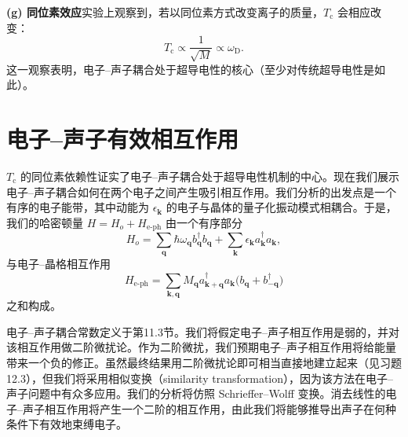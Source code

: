 \textbf{(g) 同位素效应}\quad 实验上观察到，若以同位素方式改变离子的质量，$T_{\mathrm{c}}$ 会相应改变：
\begin{equation*}
T_{\mathrm{c}}\propto\frac{1}{\sqrt{M}}\propto\omega_{\mathrm{D}}.\tag{12.21}
\end{equation*}
这一观察表明，电子–声子耦合处于超导电性的核心（至少对传统超导电性是如此）。

\section{电子–声子有效相互作用}

$T_{\mathrm{c}}$ 的同位素依赖性证实了电子–声子耦合处于超导电性机制的中心。现在我们展示电子–声子耦合如何在两个电子之间产生吸引相互作用。我们分析的出发点是一个有序的电子能带，其中动能为 $\epsilon_{\mathbf{k}}$ 的电子与晶体的量子化振动模式相耦合。于是，我们的哈密顿量 $H=H_{o}+H_{\mathrm{e}\text{-}\mathrm{ph}}$ 由一个有序部分
\begin{equation*}
H_{o}=\sum_{\mathbf{q}}\hbar\omega_{\mathbf{q}}b_{\mathbf{q}}^{\dagger}b_{\mathbf{q}}+\sum_{\mathbf{k}}\epsilon_{\mathbf{k}}a_{\mathbf{k}}^{\dagger}a_{\mathbf{k}},\tag{12.22}
\end{equation*}
与电子–晶格相互作用
\begin{equation*}
H_{\mathrm{e}\text{-}\mathrm{ph}}=\sum_{\mathbf{k},\mathbf{q}}M_{\mathbf{q}}a_{\mathbf{k}+\mathbf{q}}^{\dagger}a_{\mathbf{k}}\bigl(b_{\mathbf{q}}+b_{-\mathbf{q}}^{\dagger}\bigr)\tag{12.23}
\end{equation*}
之和构成。

电子–声子耦合常数定义于第11.3节。我们将假定电子–声子相互作用是弱的，并对该相互作用做二阶微扰论。作为二阶微扰，我们预期电子–声子相互作用将给能量带来一个负的修正。虽然最终结果用二阶微扰论即可相当直接地建立起来（见习题12.3），但我们将采用相似变换（similarity transformation），因为该方法在电子–声子问题中有众多应用。我们的分析将仿照 Schrieffer–Wolff 变换。消去线性的电子–声子相互作用将产生一个二阶的相互作用，由此我们将能够推导出声子在何种条件下有效地束缚电子。

